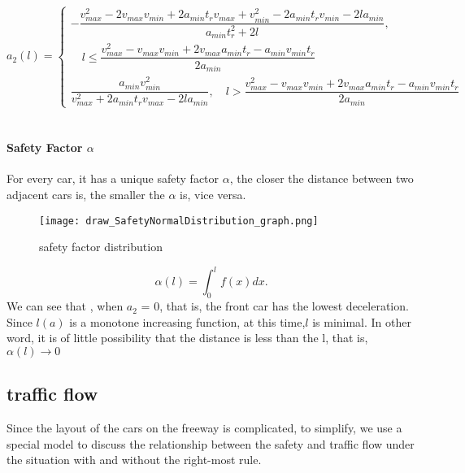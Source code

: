 \[ a_2(l) = \begin{cases}
-\dfrac{v_{max}^2 - 2v_{max}v_{min} + 2a_{min}t_rv_{max} + v_{min}^2 - 2a_{min}t_rv_{min} - 2la_{min}}{a_{min}t_r^2 + 2l}, 
\\

\quad l \leq \dfrac{v_{max}^2 - v_{max}v_{min} + 2v_{max}a_{min}t_r - a_{min} v_{min}t_r}{2a_{min}}\\
\dfrac{a_{min}v_{min}^2}{v_{max}^2 + 2a_{min}t_rv_{max} - 2la_{min}}, \quad  l > \dfrac{v_{max}^2 - v_{max}v_{min} + 2v_{max}a_{min}t_r - a_{min} v_{min}t_r}{2a_{min}}
\end{cases}\]
\\
\paragraph{Safety Factor $\alpha$}
For every car, it has a unique safety factor $\alpha$, the closer the distance between two adjacent cars is, the smaller the $\alpha$ is, vice versa.\\
\begin{figure}[h]
\small
\centering
\texttt{[image: draw\_SafetyNormalDistribution\_graph.png]}
\caption{safety factor distribution} \label{fig::safety factor distribution}
\end{figure}
\begin{displaymath}
\alpha(l) = \int_{0}^{l} f(x) dx.
\end{displaymath}
We can see that , when $a_2$ = 0, that is, the front car has the lowest deceleration. Since $l(a)$ is a monotone increasing function, at this time,$l$ is minimal. In other word, it is of little possibility that the distance is less than the l, that is, $\alpha(l) \rightarrow 0$                     

\subsection{traffic flow}
Since the layout of the cars on the freeway is complicated, to simplify, we use a special model to discuss the relationship between the safety and traffic flow under the situation with and without the right-most rule.
\\
